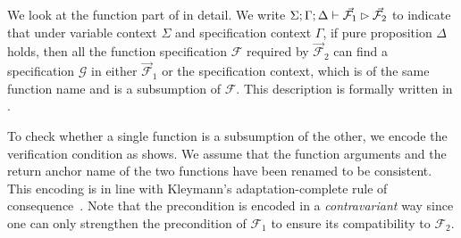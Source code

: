 We look at the function part of  in detail. We write $\Sigma; \Gamma; \Delta \vdash \vec{\mathcal{F}_1} \rhd \vec{\mathcal{F}_2}$ to indicate that under variable context $\Sigma$ and specification context $\Gamma$, if pure proposition $\Delta$ holds, then all the function specification $\mathcal{F}$ required by $\vec{\mathcal{F}}_2$ can find a specification $\mathcal{G}$ in either $\vec{\mathcal{F}}_1$ or the specification context, which is of the same function name and is a subsumption of $\mathcal{F}$. This description is formally written in .


To check whether a single function is a subsumption of the other, we encode the verification condition as  shows. We assume that the function arguments and the return anchor name of the two functions have been renamed to be consistent. This encoding is in line with Kleymann’s adaptation-complete
rule of consequence~\cite{Kleymann1999HoareAux}. Note that the precondition is encoded in a \emph{contravariant} way since one can only strengthen the precondition of $\mathcal{F}_1$ to ensure its compatibility to  $\mathcal{F}_2$.



